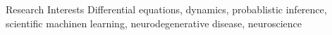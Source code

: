 \begin{rSection}{Research Interests}
Differential equations, dynamics, probablistic inference, scientific machinen learning, neurodegenerative disease, neuroscience
\end{rSection}